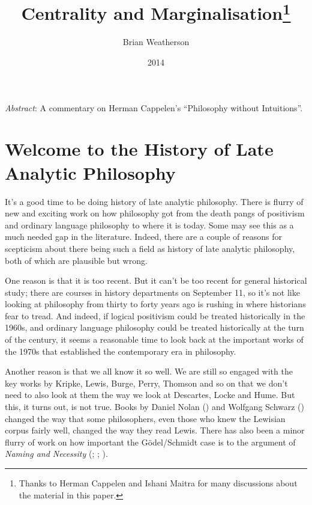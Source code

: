 \documentclass[
  11pt,
  letterpaper,
  DIV=11,
  numbers=noendperiod,
  twoside]{scrartcl}
\title{Centrality and Marginalisation\thanks{Thanks to Herman Cappelen
and Ishani Maitra for many discussions about the material in this
paper.}}
\author{Brian Weatherson}
\date{2014}
\renewenvironment{abstract}
 {\vspace{-1.25cm}
 \quotation\small\noindent\emph{Abstract}:}
 {\endquotation}
\begin{document}
\maketitle
\begin{abstract}
A commentary on Herman Cappelen's ``Philosophy without Intuitions''.
\end{abstract}


\section{Welcome to the History of Late Analytic
Philosophy}\label{sec-Intro}

It's a good time to be doing history of late analytic philosophy. There
is flurry of new and exciting work on how philosophy got from the death
pangs of positivism and ordinary language philosophy to where it is
today. Some may see this as a much needed gap in the literature. Indeed,
there are a couple of reasons for scepticism about there being such a
field as history of late analytic philosophy, both of which are
plausible but wrong.

One reason is that it is too recent. But it can't be too recent for
general historical study; there are courses in history departments on
September 11, so it's not like looking at philosophy from thirty to
forty years ago is rushing in where historians fear to tread. And
indeed, if logical positivism could be treated historically in the
1960s, and ordinary language philosophy could be treated historically at
the turn of the century, it seems a reasonable time to look back at the
important works of the 1970s that established the contemporary era in
philosophy.

Another reason is that we all know it so well. We are still so engaged
with the key works by Kripke, Lewis, Burge, Perry, Thomson and so on
that we don't need to also look at them the way we look at Descartes,
Locke and Hume. But this, it turns out, is not true. Books by Daniel
Nolan () and Wolfgang Schwarz
() changed the way that some
philosophers, even those who knew the Lewisian corpus fairly well,
changed the way they read Lewis. There has also been a minor flurry of
work on how important the Gödel/Schmidt case is to the argument of
\emph{Naming and Necessity} (;
;
).
\end{document}
